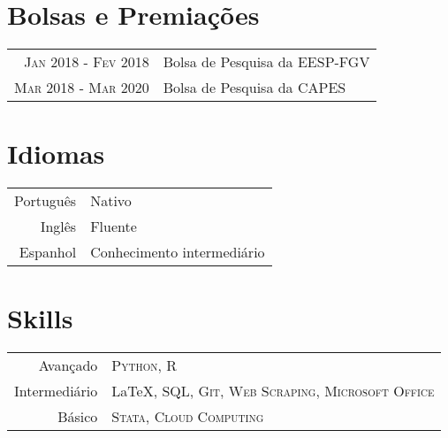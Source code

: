\documentclass[a4paper,10pt]{article}
\begin{document}
\begin{samepage}
\section{Bolsas e Premiações}
\begin{tabular}{r|p{10.5cm}}
    \textsc{Jan} 2018 - \textsc{Fev} 2018 & Bolsa de Pesquisa da EESP-FGV \\
    \textsc{Mar} 2018 - \textsc{Mar} 2020 & Bolsa de Pesquisa da CAPES
\end{tabular}

\section{Idiomas}
\begin{tabular}{r|l}
    Português & Nativo \\
    Inglês & Fluente \\
    Espanhol & Conhecimento intermediário
\end{tabular}

\section{Skills}
\begin{tabular}{r|l}
    Avançado & \textsc{Python, R} \\
    Intermediário & \LaTeX{}, \textsc{SQL, Git, Web Scraping, Microsoft Office} \\
    Básico & \textsc{Stata, Cloud Computing}
\end{tabular}
\end{samepage}
\end{document}

